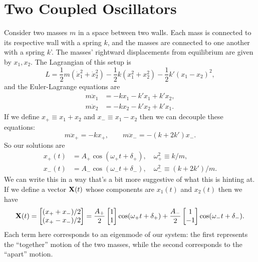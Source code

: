 \documentclass[../p111main.tex]{subfiles}
\begin{document}
\section{Two Coupled Oscillators}
Consider two masses $m$ in a space between two walls.
Each mass is connected to its respective wall with a spring $k$, and the masses are connected to one another with a spring $k$'.
The masses' rightward displacements from equilibrium are given by $x_1, x_2$.
The Lagrangian of this setup is
\[ L = \frac{1}{2} m \left( \dot x_1^2 + \dot x_2^2 \right) - \frac{1}{2} k \left( x_1^2 + x_2^2 \right) - \frac{1}{2} k' \left( x_1 - x_2 \right)^2, \]
and the Euler-Lagrange equations are
\begin{align*}
    m \ddot x_1 &= -k x_1 - k' x_1 + k' x_2, \\
    m \ddot x_2 &= -k x_2 - k' x_2 + k' x_1.
\end{align*}
If we define $x_+ \equiv x_1 + x_2$ and $x_- \equiv x_1 - x_2$ then we can decouple these equations:
\[ m \ddot x_+ = -kx_+, \qquad m\ddot x_- = -(k + 2k') x_-. \]
So our solutions are
\begin{align*}
    x_+(t) &= A_+ \cos (\omega_+ t + \delta_+), \quad \omega_+^2 \equiv k / m, \\
    x_-(t) &= A_- \cos (\omega_- t + \delta_-), \quad \omega_-^2 \equiv (k + 2k') / m.
\end{align*}
We can write this in a way that's a bit more suggestive of what this is hinting at.
If we define a vector $\mathbf{X}(t)$ whose components are $x_1(t)$ and $x_2(t)$ then we have
\[ \mathbf{X}(t) = \begin{bmatrix} (x_+ + x_-) / 2 \\ (x _+ - x_-) / 2 \end{bmatrix} = \frac{A_+}{2} \begin{bmatrix} 1 \\ 1 \end{bmatrix} \cos (\omega_+ t + \delta_+) + \frac{A_-}{2} \begin{bmatrix} 1 \\ -1 \end{bmatrix} \cos (\omega_- t + \delta_-). \]
Each term here corresponds to an eigenmode of our system: the first represents the ``together'' motion of the two masses, while the second corresponds to the ``apart'' motion.
\end{document}

